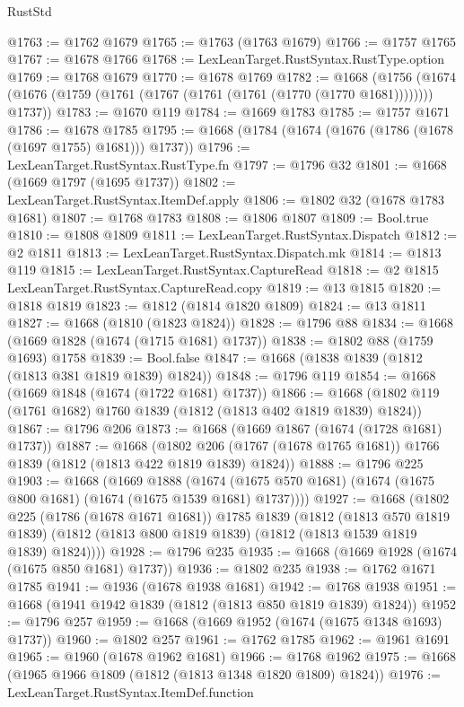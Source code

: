 \begin{lexlean}{RustStd}
\begin{coremodule}
@1763 := @1762 @1679
@1765 := @1763 (@1763 @1679)
@1766 := @1757 @1765
@1767 := @1678 @1766
@1768 := LexLeanTarget.RustSyntax.RustType.option
@1769 := @1768 @1679
@1770 := @1678 @1769
@1782 := @1668
    (@1756 (@1674 (@1676 (@1759 (@1761 (@1767 (@1761 (@1761 (@1770 (@1770 @1681)))))))) @1737))
@1783 := @1670 @119
@1784 := @1669 @1783
@1785 := @1757 @1671
@1786 := @1678 @1785
@1795 := @1668 (@1784 (@1674 (@1676 (@1786 (@1678 (@1697 @1755) @1681))) @1737))
@1796 := LexLeanTarget.RustSyntax.RustType.fn
@1797 := @1796 @32
@1801 := @1668 (@1669 @1797 (@1695 @1737))
@1802 := LexLeanTarget.RustSyntax.ItemDef.apply
@1806 := @1802 @32 (@1678 @1783 @1681)
@1807 := @1768 @1783
@1808 := @1806 @1807
@1809 := Bool.true
@1810 := @1808 @1809
@1811 := LexLeanTarget.RustSyntax.Dispatch
@1812 := @2 @1811
@1813 := LexLeanTarget.RustSyntax.Dispatch.mk
@1814 := @1813 @119
@1815 := LexLeanTarget.RustSyntax.CaptureRead
@1818 := @2 @1815 LexLeanTarget.RustSyntax.CaptureRead.copy
@1819 := @13 @1815
@1820 := @1818 @1819
@1823 := @1812 (@1814 @1820 @1809)
@1824 := @13 @1811
@1827 := @1668 (@1810 (@1823 @1824))
@1828 := @1796 @88
@1834 := @1668 (@1669 @1828 (@1674 (@1715 @1681) @1737))
@1838 := @1802 @88 (@1759 @1693) @1758
@1839 := Bool.false
@1847 := @1668 (@1838 @1839 (@1812 (@1813 @381 @1819 @1839) @1824))
@1848 := @1796 @119
@1854 := @1668 (@1669 @1848 (@1674 (@1722 @1681) @1737))
@1866 := @1668 (@1802 @119 (@1761 @1682) @1760 @1839 (@1812 (@1813 @402 @1819 @1839) @1824))
@1867 := @1796 @206
@1873 := @1668 (@1669 @1867 (@1674 (@1728 @1681) @1737))
@1887 := @1668
    (@1802 @206 (@1767 (@1678 @1765 @1681)) @1766 @1839 (@1812 (@1813 @422 @1819 @1839) @1824))
@1888 := @1796 @225
@1903 := @1668
    (@1669
      @1888
      (@1674 (@1675 @570 @1681) (@1674 (@1675 @800 @1681) (@1674 (@1675 @1539 @1681) @1737))))
@1927 := @1668
    (@1802
      @225
      (@1786 (@1678 @1671 @1681))
      @1785
      @1839
      (@1812
        (@1813 @570 @1819 @1839)
        (@1812 (@1813 @800 @1819 @1839) (@1812 (@1813 @1539 @1819 @1839) @1824))))
@1928 := @1796 @235
@1935 := @1668 (@1669 @1928 (@1674 (@1675 @850 @1681) @1737))
@1936 := @1802 @235
@1938 := @1762 @1671 @1785
@1941 := @1936 (@1678 @1938 @1681)
@1942 := @1768 @1938
@1951 := @1668 (@1941 @1942 @1839 (@1812 (@1813 @850 @1819 @1839) @1824))
@1952 := @1796 @257
@1959 := @1668 (@1669 @1952 (@1674 (@1675 @1348 @1693) @1737))
@1960 := @1802 @257
@1961 := @1762 @1785
@1962 := @1961 @1691
@1965 := @1960 (@1678 @1962 @1681)
@1966 := @1768 @1962
@1975 := @1668 (@1965 @1966 @1809 (@1812 (@1813 @1348 @1820 @1809) @1824))
@1976 := LexLeanTarget.RustSyntax.ItemDef.function

\end{coremodule}
\end{lexlean}
